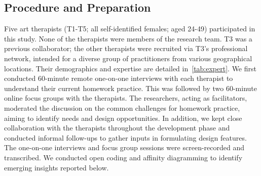 \subsection{Procedure and Preparation}
Five art therapists (T1-T5; all self-identified females; aged 24-49) participated in this study. None of the therapists were members of the research team. T3 was a previous collaborator; the other therapists were recruited via T3's professional network, intended for a diverse group of practitioners from various geographical locations.
Their demographics and expertise are detailed in~\autoref{tab:expert}.
We first conducted 60-minute remote one-on-one interviews with each therapist to understand their current homework practice. This was followed by two 60-minute online focus groups with the therapists. The researchers, acting as facilitators, moderated the discussion on the common challenges for homework practice, aiming to identify needs and design opportunities.
In addition, we kept close collaboration with the therapists throughout the development phase and conducted informal follow-ups to gather inputs in formulating design features.
The one-on-one interviews and focus group sessions were screen-recorded and transcribed. We conducted open coding and affinity diagramming to identify emerging insights reported below.



